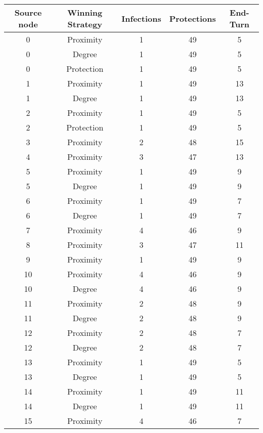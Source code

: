 \documentclass[results.tex]{subfiles}
\begin{document}
\begin{center}
  \begin{tabular}{| c || c | c | c | c |}
    \hline
    {\bfseries Source node} & {\bfseries Winning Strategy} & {\bfseries Infections} & {\bfseries Protections} & {\bfseries End-Turn} \\  %
    \hline\hline
    0 & Proximity & 1 & 49 & 5 \\ 
    \hline
    0 & Degree & 1 & 49 & 5 \\ 
    \hline
    0 & Protection & 1 & 49 & 5 \\ 
    \hline
    1 & Proximity & 1 & 49 & 13 \\ 
    \hline
    1 & Degree & 1 & 49 & 13 \\ 
    \hline
    2 & Proximity & 1 & 49 & 5 \\ 
    \hline
    2 & Protection & 1 & 49 & 5 \\ 
    \hline
    3 & Proximity & 2 & 48 & 15 \\ 
    \hline
    4 & Proximity & 3 & 47 & 13 \\ 
    \hline
    5 & Proximity & 1 & 49 & 9 \\ 
    \hline
    5 & Degree & 1 & 49 & 9 \\ 
    \hline
    6 & Proximity & 1 & 49 & 7 \\ 
    \hline
    6 & Degree & 1 & 49 & 7 \\ 
    \hline
    7 & Proximity & 4 & 46 & 9 \\ 
    \hline
    8 & Proximity & 3 & 47 & 11 \\ 
    \hline
    9 & Proximity & 1 & 49 & 9 \\ 
    \hline
    10 & Proximity & 4 & 46 & 9 \\ 
    \hline
    10 & Degree & 4 & 46 & 9 \\ 
    \hline
    11 & Proximity & 2 & 48 & 9 \\ 
    \hline
    11 & Degree & 2 & 48 & 9 \\ 
    \hline
    12 & Proximity & 2 & 48 & 7 \\ 
    \hline
    12 & Degree & 2 & 48 & 7 \\ 
    \hline
    13 & Proximity & 1 & 49 & 5 \\ 
    \hline
    13 & Degree & 1 & 49 & 5 \\ 
    \hline
    14 & Proximity & 1 & 49 & 11 \\ 
    \hline
    14 & Degree & 1 & 49 & 11 \\ 
    \hline
    15 & Proximity & 4 & 46 & 7 \\ 

\end{tabular}
\end{center}
\end{document}
